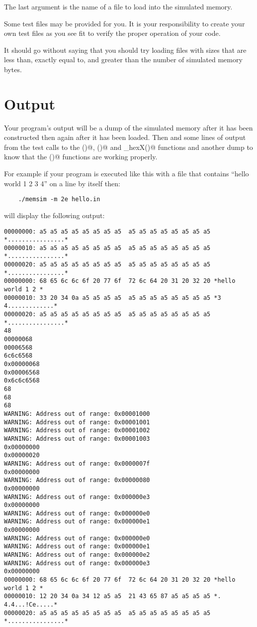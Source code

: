 \documentclass[11pt]{article}
\begin{document}
The last argument is the name of a file to load into the simulated memory.  

Some test files may be provided for you.
It is your responsibility to create your own test files as you see fit to 
verify the proper operation of your code.

It should go without saying that you should try loading files with sizes that are 
less than, exactly equal to, and greater than the number of simulated memory bytes.


\section{Output}

Your program's output will be a dump of the simulated memory after it has 
been constructed then again after it has been loaded.  Then and some 
lines of output from the test calls to the \verb@setX()@, \verb@getX()@ 
and \verb@to_hexX()@ functions and another dump to know that the \verb@setX()@
functions are working properly.

For example if your program is executed like this with a file that contains
``hello world 1 2 3 4'' on a line by itself then:
\begin{verbatim}
    ./memsim -m 2e hello.in
\end{verbatim}
will display the following output:\\
\begin{minipage}{\textwidth}
\begin{lstlisting}[frame=single, title={Sample Run}]
00000000: a5 a5 a5 a5 a5 a5 a5 a5  a5 a5 a5 a5 a5 a5 a5 a5 *................*
00000010: a5 a5 a5 a5 a5 a5 a5 a5  a5 a5 a5 a5 a5 a5 a5 a5 *................*
00000020: a5 a5 a5 a5 a5 a5 a5 a5  a5 a5 a5 a5 a5 a5 a5 a5 *................*
00000000: 68 65 6c 6c 6f 20 77 6f  72 6c 64 20 31 20 32 20 *hello world 1 2 *
00000010: 33 20 34 0a a5 a5 a5 a5  a5 a5 a5 a5 a5 a5 a5 a5 *3 4.............*
00000020: a5 a5 a5 a5 a5 a5 a5 a5  a5 a5 a5 a5 a5 a5 a5 a5 *................*
48
00000068
00006568
6c6c6568
0x00000068
0x00006568
0x6c6c6568
68
68
68
WARNING: Address out of range: 0x00001000
WARNING: Address out of range: 0x00001001
WARNING: Address out of range: 0x00001002
WARNING: Address out of range: 0x00001003
0x00000000
0x00000020
WARNING: Address out of range: 0x0000007f
0x00000000
WARNING: Address out of range: 0x00000080
0x00000000
WARNING: Address out of range: 0x000000e3
0x00000000
WARNING: Address out of range: 0x000000e0
WARNING: Address out of range: 0x000000e1
0x00000000
WARNING: Address out of range: 0x000000e0
WARNING: Address out of range: 0x000000e1
WARNING: Address out of range: 0x000000e2
WARNING: Address out of range: 0x000000e3
0x00000000
00000000: 68 65 6c 6c 6f 20 77 6f  72 6c 64 20 31 20 32 20 *hello world 1 2 *
00000010: 12 20 34 0a 34 12 a5 a5  21 43 65 87 a5 a5 a5 a5 *. 4.4...!Ce.....*
00000020: a5 a5 a5 a5 a5 a5 a5 a5  a5 a5 a5 a5 a5 a5 a5 a5 *................*
\end{lstlisting}
\end{minipage}
\end{document}
